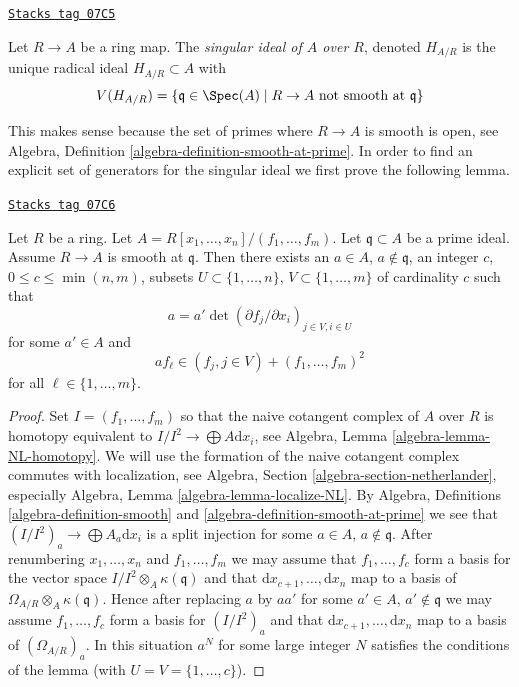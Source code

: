 \begin{definition}
\label{smoothing-definition-singular-ideal}
\href{https://stacks.math.columbia.edu/tag/07C5}{\texttt{Stacks tag 07C5}}

Let $R \to A$ be a ring map. The {\it singular ideal of $A$ over $R$},
denoted $H_{A/R}$ is the unique radical ideal $H_{A/R} \subset A$ with
$$
V(H_{A/R}) = \{\mathfrak q \in \Spec(A) \mid R \to A
\text{ not smooth at }\mathfrak q\}
$$
\end{definition}

This makes sense because the set of primes where $R \to A$ is smooth
is open, see
Algebra, Definition \ref{algebra-definition-smooth-at-prime}.
In order to find an explicit set
of generators for the singular ideal we first prove the following lemma.

\begin{lemma}
\label{smoothing-lemma-find-strictly-standard}
\href{https://stacks.math.columbia.edu/tag/07C6}{\texttt{Stacks tag 07C6}}

Let $R$ be a ring. Let $A = R[x_1, \ldots, x_n]/(f_1, \ldots, f_m)$.
Let $\mathfrak q \subset A$ be a prime ideal. Assume $R \to A$ is smooth
at $\mathfrak q$. Then there exists an $a \in A$, $a \not \in \mathfrak q$,
an integer $c$, $0 \leq c \leq \min(n, m)$, subsets
$U \subset \{1, \ldots, n\}$, $V \subset \{1, \ldots, m\}$
of cardinality $c$ such that
$$
a = a' \det(\partial f_j/\partial x_i)_{j \in V, i \in U}
$$
for some $a' \in A$ and
$$
a f_\ell \in (f_j, j \in V) + (f_1, \ldots, f_m)^2
$$
for all $\ell \in \{1, \ldots, m\}$.
\end{lemma}

\begin{proof}
Set $I = (f_1, \ldots, f_m)$ so that the naive cotangent
complex of $A$ over $R$ is homotopy equivalent to
$I/I^2 \to \bigoplus A\text{d}x_i$, see
Algebra, Lemma \ref{algebra-lemma-NL-homotopy}.
We will use the formation of the naive cotangent complex commutes with
localization, see Algebra, Section \ref{algebra-section-netherlander},
especially Algebra, Lemma \ref{algebra-lemma-localize-NL}.
By Algebra, Definitions \ref{algebra-definition-smooth} and
\ref{algebra-definition-smooth-at-prime}
we see that $(I/I^2)_a \to \bigoplus A_a\text{d}x_i$
is a split injection for some $a \in A$, $a \not \in \mathfrak q$.
After renumbering $x_1, \ldots, x_n$ and $f_1, \ldots, f_m$ we may
assume that $f_1, \ldots, f_c$ form a basis for
the vector space $I/I^2 \otimes_A \kappa(\mathfrak q)$ and that
$\text{d}x_{c + 1}, \ldots, \text{d}x_n$ map to a basis of
$\Omega_{A/R} \otimes_A \kappa(\mathfrak q)$. Hence after replacing $a$
by $aa'$ for some $a' \in A$, $a' \not \in \mathfrak q$ we may assume
$f_1, \ldots, f_c$ form a basis for $(I/I^2)_a$ and that
$\text{d}x_{c + 1}, \ldots, \text{d}x_n$ map to a basis of
$(\Omega_{A/R})_a$. In this situation $a^N$ for some large integer
$N$ satisfies the conditions of the lemma (with $U = V = \{1, \ldots, c\}$).
\end{proof}

